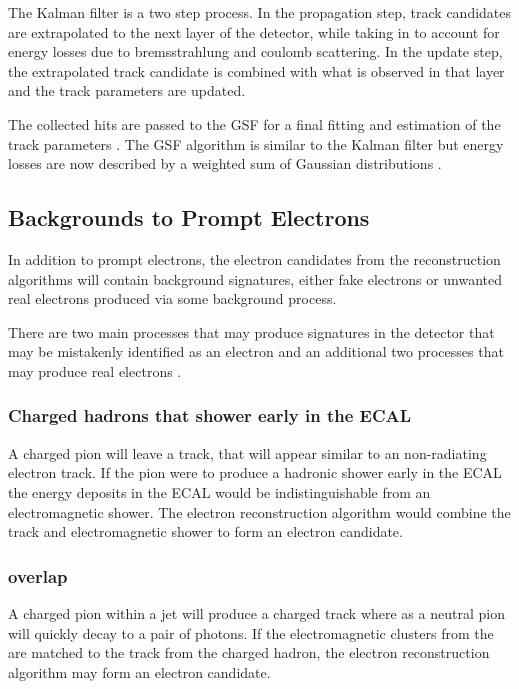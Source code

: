 The Kalman filter is a two step process. In the propagation step, track
candidates are extrapolated to the next layer of the detector, while taking in
to account for energy losses due to bremsstrahlung and coulomb scattering.  In
the update step, the extrapolated track candidate is combined with what is
observed in that layer and the track parameters are updated. 

The collected hits are passed to the GSF for a final fitting and estimation of
the track parameters \cite{cmsgsf}. The GSF algorithm is similar to the Kalman filter but
energy losses are now described by a weighted sum of Gaussian
distributions \cite{gsf}.

\subsection{Backgrounds to Prompt Electrons}
In addition to prompt electrons, the electron candidates from the reconstruction
algorithms will contain background signatures, either fake electrons or unwanted
real electrons produced via some background process.

There are two main processes that may produce signatures in the detector that
may be mistakenly identified as an electron and an additional
two processes that may produce real electrons \cite{nikos}.

\subsubsection{Charged hadrons that shower early in the ECAL}
A charged pion will leave a track, that will appear similar to an non-radiating
electron track. If the pion were to produce a hadronic shower early in the ECAL
the energy deposits in the ECAL would be indistinguishable from an
electromagnetic shower. The electron reconstruction algorithm would combine the
track and electromagnetic shower to form an electron candidate.

\subsubsection{\HepProcess{\Ppipm \Ppizero} overlap}
A charged pion within a jet will produce a charged track where as a neutral pion
will quickly decay to a pair of photons. If the electromagnetic clusters from
the \Ppizero are matched to the track from the charged hadron, the electron
reconstruction algorithm may form an electron candidate.

